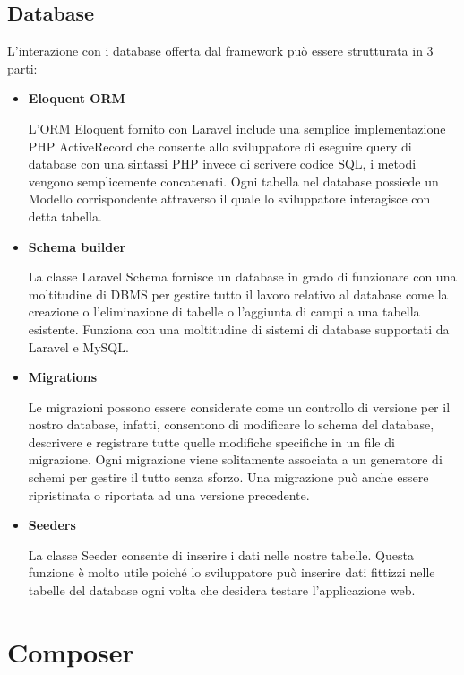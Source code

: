 \subsection{Database}
L'interazione con i database offerta dal framework può essere strutturata in 3 parti:
\begin{itemize}
	\item \textbf{Eloquent ORM}
	
	L'ORM Eloquent fornito con Laravel include una semplice implementazione PHP ActiveRecord che consente allo sviluppatore di eseguire query di database con una sintassi PHP invece di scrivere codice SQL, i metodi vengono semplicemente concatenati. Ogni tabella nel database possiede un Modello corrispondente attraverso il quale lo sviluppatore interagisce con detta tabella.
	
	\item \textbf{Schema builder}
	
	La classe Laravel Schema fornisce un database in grado di funzionare con una moltitudine di DBMS per gestire tutto il lavoro relativo al database come la creazione o l'eliminazione di tabelle o l'aggiunta di campi a una tabella esistente. Funziona con una moltitudine di sistemi di database supportati da Laravel e MySQL.
	
	\item \textbf{Migrations}
	
	Le migrazioni possono essere considerate come un controllo di versione per il nostro database, infatti, consentono di modificare lo schema del database, descrivere e registrare tutte quelle modifiche specifiche in un file di migrazione. Ogni migrazione viene solitamente associata a un generatore di schemi per gestire il tutto senza sforzo. Una migrazione può anche essere ripristinata o riportata ad una versione precedente.
	
	\item \textbf{Seeders}
	
	La classe Seeder consente di inserire i dati nelle nostre tabelle. Questa funzione è molto utile poiché lo sviluppatore può inserire dati fittizzi nelle tabelle del database ogni volta che desidera testare l'applicazione web.
	
\end{itemize}

\section{Composer}

